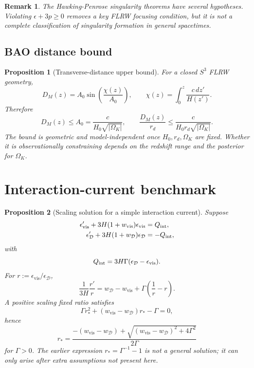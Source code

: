 \documentclass[
  aps,
  prd,
  reprint,
  superscriptaddress,
  nofootinbib,
  floatfix,
  longbibliography
]{revtex4-2}
\newtheorem{proposition}{Proposition}
\newtheorem{remark}{Remark}
\newcommand{\D}{\mathcal D}
\newcommand{\vis}{\mathrm{vis}}
\begin{document}
\begin{remark}
The Hawking-Penrose singularity theorems have several hypotheses.  Violating
\(\epsilon+3p\ge0\) removes a key FLRW focusing condition, but it is not a complete
classification of singularity formation in general spacetimes.
\end{remark}

\subsection{BAO distance bound}

\begin{proposition}[Transverse-distance upper bound]
\label{prop:bao}
For a closed \(S^3\) FLRW geometry,
\begin{equation}
  D_M(z)=A_0\sin\!\left(\frac{\chi(z)}{A_0}\right),
  \qquad
  \chi(z)=\int_0^z\frac{c\,dz'}{H(z')}.
\end{equation}
Therefore
\begin{equation}
  D_M(z)\le A_0=\frac{c}{H_0\sqrt{|\Omega_K|}},
  \qquad
  \frac{D_M(z)}{r_d}\le
  \frac{c}{H_0r_d\sqrt{|\Omega_K|}} .
  \label{eq:bao_bound}
\end{equation}
The bound is geometric and model-independent once \(H_0,r_d,\Omega_K\) are fixed.
Whether it is observationally constraining depends on the redshift range and the
posterior for \(\Omega_K\).
\end{proposition}

\section{Interaction-current benchmark}
\label{sec:interaction}

\begin{proposition}[Scaling solution for a simple interaction current]
\label{prop:int}
Suppose
\begin{align}
  \epsilon'_\vis+3H(1+w_\vis)\epsilon_\vis &= Q_{\rm int},\\
  \epsilon'_\D+3H(1+w_\D)\epsilon_\D &= -Q_{\rm int},
\end{align}
with
\begin{equation}
  Q_{\rm int}=3H\Gamma(\epsilon_\D-\epsilon_\vis).
\end{equation}
For \(r:=\epsilon_\vis/\epsilon_\D\),
\begin{equation}
  \frac{1}{3H}\frac{r'}{r}
  =
  w_\D-w_\vis+\Gamma\left(\frac{1}{r}-r\right).
\end{equation}
A positive scaling fixed ratio satisfies
\begin{equation}
  \Gamma r_*^2+(w_\vis-w_\D)r_*-\Gamma=0,
\end{equation}
hence
\begin{equation}
  r_*=
  \frac{-(w_\vis-w_\D)+
  \sqrt{(w_\vis-w_\D)^2+4\Gamma^2}}{2\Gamma}
\end{equation}
for \(\Gamma>0\).  The earlier expression \(r_*=\Gamma^{-1}-1\) is not a
general solution; it can only arise after extra assumptions not present here.
\end{proposition}
\end{document}
